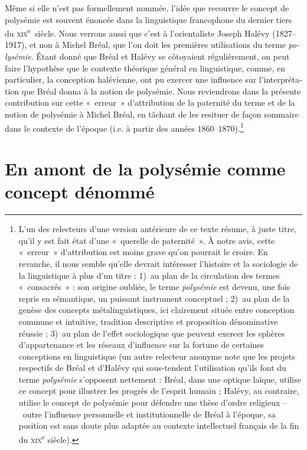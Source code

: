 \documentclass[french,output=paper,colorlinks,citecolor=brown]{../langscibook}
\begin{document}
\begin{otherlanguage}{french}
\largerpage[1.5]
Même si elle n'est pas formellement nommée, l’idée que recouvre le concept de polysémie est souvent énoncée dans la linguistique francophone du dernier tiers du \textsc{xix}\textsuperscript{e}~siècle. Nous verrons aussi que c’est à l’orientaliste Joseph Halévy (1827--1917), et non à Michel Bréal, que l’on doit les premières utilisations du terme \textit{polysémie}. Étant donné que Bréal et Halévy se côtoyaient régulièrement, on peut faire l’hypothèse que le contexte théorique général en linguistique, comme, en particulier, la conception halévienne, ont pu exercer une influence sur l’interprétation que Bréal donna à la notion de polysémie. Nous reviendrons dans la présente contribution sur cette «~erreur~» d’attribution de la paternité du terme et de la notion de polysémie à Michel Bréal, en tâchant de les resituer de façon sommaire dans le contexte de l’époque (i.e. à partir des années 1860--1870).\footnote{L’un des relecteurs d’une version antérieure de ce texte résume, à juste titre, qu’il y est fait état d’une «~querelle de paternité~». À notre avis, cette «~erreur~» d’attribution est moins grave qu’on pourrait le croire. En revanche, il nous semble qu’elle devrait intéresser l’histoire et la sociologie de la linguistique à plus d’un titre : 1)~au plan de la circulation des termes «~consacrés~» : son origine oubliée, le terme \textit{polysémie} est devenu, une fois repris en sémantique, un puissant instrument conceptuel ; 2)~au plan de la genèse des concepts métalinguistiques, ici clairement située entre conception commune et intuitive, tradition descriptive et proposition dénominative réussie ; 3)~au plan de l’effet sociologique que peuvent exercer les sphères d’appartenance et les réseaux d’influence sur la fortune de certaines conceptions en linguistique (un autre relecteur anonyme note que les projets respectifs de Bréal et d’Halévy qui sous-tendent l’utilisation qu’ils font du terme \textit{polysémie} s’opposent nettement : Bréal, dans une optique laïque, utilise ce concept pour illustrer les progrès de l’esprit humain ; Halévy, au contraire, utilise le concept de polysémie pour défendre une thèse d’ordre religieux –~outre l’influence personnelle et institutionnelle de Bréal à l’époque, sa position est sans doute plus adaptée au contexte intellectuel français de la fin du \textsc{xix}\textsuperscript{e} siècle).}
\clearpage
 
\section{En amont de la polysémie comme concept dénommé}


\end{otherlanguage}
\end{document}
